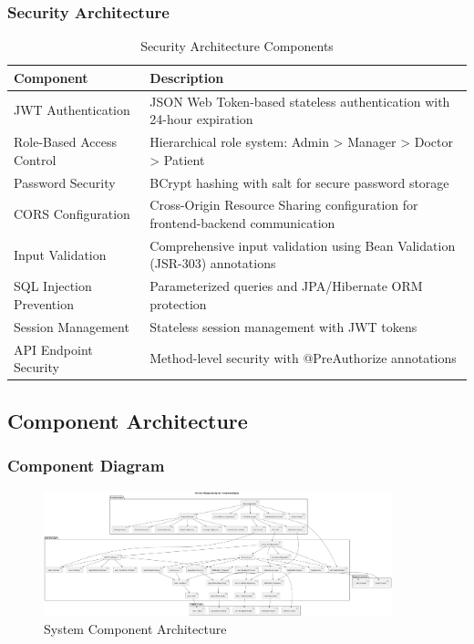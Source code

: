 \documentclass[12pt,a4paper]{article}
\begin{document}
\subsubsection{Security Architecture}

\begin{table}[H]
\centering
\caption{Security Architecture Components}
\label{tab:security-architecture}
\begin{tabularx}{\textwidth}{|l|X|}
\hline
\textbf{Component} & \textbf{Description} \\
\hline
JWT Authentication & JSON Web Token-based stateless authentication with 24-hour expiration \\
\hline
Role-Based Access Control & Hierarchical role system: Admin > Manager > Doctor > Patient \\
\hline
Password Security & BCrypt hashing with salt for secure password storage \\
\hline
CORS Configuration & Cross-Origin Resource Sharing configuration for frontend-backend communication \\
\hline
Input Validation & Comprehensive input validation using Bean Validation (JSR-303) annotations \\
\hline
SQL Injection Prevention & Parameterized queries and JPA/Hibernate ORM protection \\
\hline
Session Management & Stateless session management with JWT tokens \\
\hline
API Endpoint Security & Method-level security with @PreAuthorize annotations \\
\hline
\end{tabularx}
\end{table}

\subsection{Component Architecture}

\subsubsection{Component Diagram}

\begin{figure}[H]
\centering
\includegraphics[width=0.9\textwidth]{diagrams/component_diagram.png}
\caption{System Component Architecture}
\label{fig:component-diagram}
\end{figure}
\end{document}

